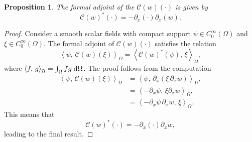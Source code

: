 \documentclass{ifacconf}
\newcommand{\inner}[3][]{\ensuremath{\left\langle #2, \, #3 \right\rangle_{#1}}}
\newtheorem{proposition}{Proposition}
\newtheorem{proof}{Proof}
\begin{document}
\begin{proposition}\label{prop:adjC}
	The formal adjoint of the $\mathcal{C}(w)(\cdot)$ is given by
	\begin{equation}
		\mathcal{C}(w)^*(\cdot) = -\partial_x (\cdot) \partial_x(w).
	\end{equation}
\end{proposition}
\begin{proof}
	Consider a smooth scalar fields with compact support  $\psi \in C^\infty_0(\Omega)$ and $\xi \in C^\infty_0(\Omega)$. The formal adjoint of $\mathcal{C}(w)(\cdot)$ satisfies the relation
	\begin{equation}
		\inner[\Omega]{\psi}{\mathcal{C}(w)(\xi)} = \inner[\Omega]{\mathcal{C}(w)^*(\psi)}{\xi},
	\end{equation}
	where $\inner[\Omega]{f}{g} = \int_\Omega f g \d{\Omega}$.
	The proof follows from the computation
	\begin{equation}
		\begin{aligned}
			\inner[\Omega]{\psi}{\mathcal{C}(w)(\xi)} &= \inner[\Omega]{\psi}{\partial_x(\xi \, \partial_x w)}, \\
			&= \inner[\Omega]{-\partial_x \psi}{\xi \partial_x w}, \\
			&= \inner[\Omega]{-\partial_x \psi \, \partial_x w}{\xi}.
		\end{aligned} 
	\end{equation}
	This means that
	\begin{equation}
		\mathcal{C}(w)^*(\cdot) = -\partial_x (\cdot) \partial_x w,
	\end{equation}
	leading to the final result.
\end{proof}
\end{document}

